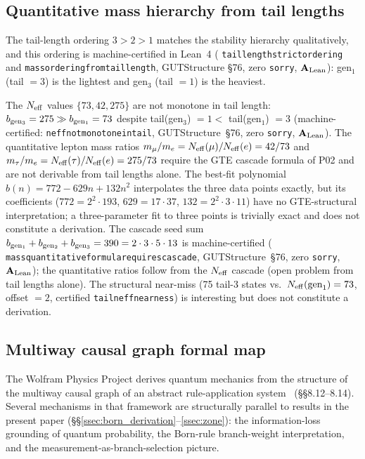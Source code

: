 \documentclass[11pt]{article}
\theoremstyle{remark}
\newcommand{\lean}[1]{%
  \penalty-100
  \begingroup\def\_{\textunderscore\allowbreak}\texttt{#1}\endgroup}
\newcommand{\CatAL}{\ensuremath{\textbf{A}_{\rm Lean}}}
\newcommand{\Neff}{N_{\rm eff}}
\begin{document}
\subsection{Quantitative mass hierarchy from tail lengths}
\label{ssec:tail_mass}

The tail-length ordering $3 > 2 > 1$ matches the stability hierarchy
qualitatively, and this ordering is machine-certified in Lean~4
(\lean{tail\_length\_strict\_ordering} and \lean{mass\_ordering\_from\_tail\_length},
GUTStructure \S76, zero \texttt{sorry}, $\CatAL$):
gen$_1$ (tail $= 3$) is the lightest and gen$_3$ (tail $= 1$) is the heaviest.

The $N_{\rm eff}$ values $\{73, 42, 275\}$ are not monotone in tail length:
$b_{\rm gen_3} = 275 \gg b_{\rm gen_1} = 73$ despite tail(gen$_3$) $= 1 <$ tail(gen$_1$) $= 3$
(machine-certified: \lean{neff\_not\_monotone\_in\_tail}, GUTStructure~\S76, zero
\texttt{sorry}, $\CatAL$).
The quantitative lepton mass ratios
$m_\mu/m_e = \Neff(\mu)/\Neff(e) = 42/73$ and
$m_\tau/m_e = \Neff(\tau)/\Neff(e) = 275/73$
require the GTE cascade formula of P02 and are not derivable from tail lengths alone.
The best-fit polynomial $b(n) = 772 - 629n + 132n^2$ interpolates the three data
points exactly, but its coefficients ($772 = 2^2 \cdot 193$, $629 = 17 \cdot 37$,
$132 = 2^2 \cdot 3 \cdot 11$) have no GTE-structural interpretation; a
three-parameter fit to three points is trivially exact and does not constitute a
derivation.
The cascade seed sum $b_{\rm gen_1} + b_{\rm gen_2} + b_{\rm gen_3} = 390 = 2 \cdot 3
\cdot 5 \cdot 13$ is machine-certified (\lean{mass\_quantitative\_formula\_requires\_cascade},
GUTStructure~\S76, zero \texttt{sorry}, $\CatAL$); the quantitative ratios follow from the
$N_{\rm eff}$ cascade (open problem from tail lengths alone).
The structural near-miss (75 tail-3 states vs.\ $\Neff(\text{gen}_1) = 73$,
offset $= 2$, certified \lean{tail\_neff\_nearness}) is interesting but does not
constitute a derivation.

\subsection{Multiway causal graph formal map}
\label{ssec:multiway_map}

The Wolfram Physics Project derives quantum mechanics from the structure
of the multiway causal graph of an abstract rule-application
system~\cite{Wolfram2020Tech} (\S\S8.12--8.14).
Several mechanisms in that framework are structurally parallel to
results in the present paper (\S\S\ref{ssec:born_derivation}--\ref{ssec:zone}):
the information-loss grounding of quantum probability, the Born-rule
branch-weight interpretation, and the measurement-as-branch-selection
picture.
\end{document}
